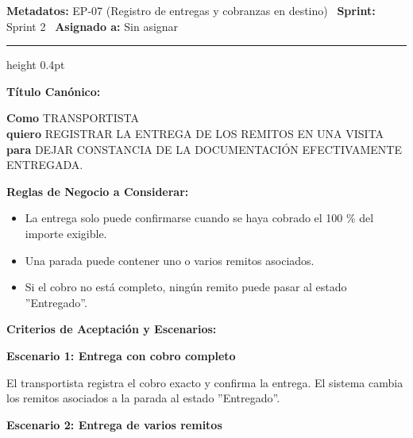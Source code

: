 \documentclass[a4paper,9pt]{article}
\begin{document}
\begin{tcolorbox}[hucard, title={\textbf{HU-30: REGISTRAR ENTREGA DE REMITOS} \hfill \scriptsize \colorbox{bluestatus}{\textbf{\ New\ }} \quad \colorbox{white}{\textcolor{primarydark}{\textbf{\ 3 pts\ }}}}]
\vspace{-1pt}
\noindent\textbf{\footnotesize Metadatos:} EP-07 (Registro de entregas y cobranzas en destino) \textbar\ \textbf{Sprint:} Sprint 2 \textbar\ \textbf{Asignado a:} Sin asignar\par\vspace{2pt}
\hrule height 0.4pt\par\vspace{3pt}
\noindent\textbf{\footnotesize Título Canónico:}\par\vspace{1pt}
{\small \textbf{Como} TRANSPORTISTA \\ \textbf{quiero} REGISTRAR LA ENTREGA DE LOS REMITOS EN UNA VISITA \\ \textbf{para} DEJAR CONSTANCIA DE LA DOCUMENTACIÓN EFECTIVAMENTE ENTREGADA.}\par\vspace{3pt}
\noindent\textbf{\footnotesize Reglas de Negocio a Considerar:}\par\vspace{1pt}
{\footnotesize
\begin{itemize}[leftmargin=12pt, nosep, itemsep=1.5pt, topsep=1pt]
\item La entrega solo puede confirmarse cuando se haya cobrado el 100 \% del importe exigible.
\item Una parada puede contener uno o varios remitos asociados.
\item Si el cobro no está completo, ningún remito puede pasar al estado ''Entregado''.
\end{itemize}
}\par\vspace{3pt}
\noindent\textbf{\footnotesize Criterios de Aceptación y Escenarios:}\par\vspace{2pt}
{\footnotesize
\noindent\textbf{\textcolor{secondarydark}{Escenario 1:  Entrega con cobro completo}}\par\vspace{1pt}
El transportista registra el cobro exacto y confirma la entrega. El sistema cambia los remitos asociados a la parada al estado ''Entregado''.\par\vspace{2.5pt}
\noindent\textbf{\textcolor{secondarydark}{Escenario 2:  Entrega de varios remitos}}\par\vspace{1pt}
}
\end{tcolorbox}
\end{document}
